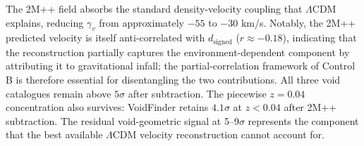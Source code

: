 \documentclass[11pt,a4paper]{article}
\begin{document}
The 2M++ field absorbs the standard density-velocity coupling that \(\Lambda\)CDM explains, reducing \(\gamma_v\) from approximately \(-55\) to \(-30\) km/\allowbreak{}s. Notably, the 2M++ predicted velocity is itself anti-correlated with \(d_\mathrm{signed}\) (\(r \approx -0.18\)), indicating that the reconstruction partially captures the environment-dependent component by attributing it to gravitational infall; the partial-correlation framework of Control B is therefore essential for disentangling the two contributions. All three void catalogues remain above \(5\sigma\) after subtraction. The piecewise \(z = 0.04\) concentration also survives: VoidFinder retains \(4.1\sigma\) at \(z < 0.04\) after 2M++ subtraction. The residual void-geometric signal at 5--9\(\sigma\) represents the component that the best available \(\Lambda\)CDM velocity reconstruction cannot account for.
\end{document}
